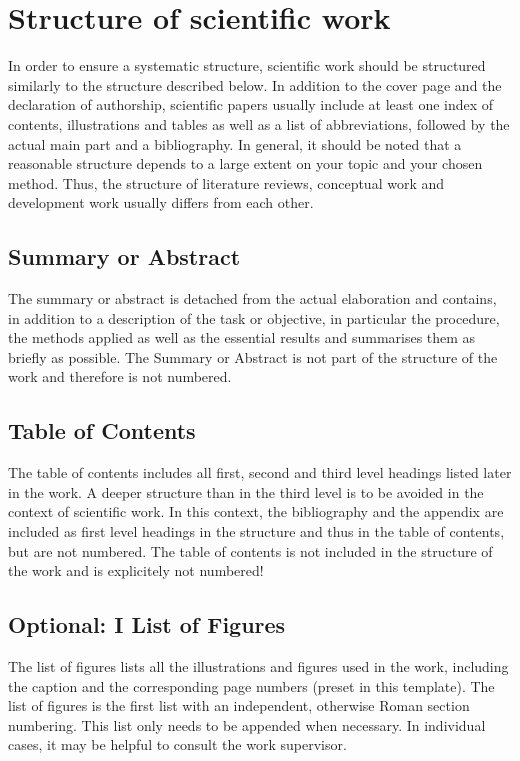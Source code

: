 
\section{Structure of scientific work}
In order to ensure a systematic structure, scientific work should be structured similarly to the structure described below. In addition to the cover page and the declaration of authorship, scientific papers usually include at least one index of contents, illustrations and tables as well as a list of abbreviations, followed by the actual main part and a bibliography. In general, it should be noted that a reasonable structure depends to a large extent on your topic and your chosen method. Thus, the structure of literature reviews, conceptual work and development work usually differs from each other.

\subsection*{Summary or Abstract}
The summary or abstract is detached from the actual elaboration and contains, in addition to a description of the task or objective, in particular the procedure, the methods applied as well as the essential results and summarises them as briefly as possible. The Summary or Abstract is not part of the structure of the work and therefore is not numbered.

\subsection*{Table of Contents}
The table of contents includes all first, second and third level headings listed later in the work. A deeper structure than in the third level is to be avoided in the context of scientific work. In this context, the bibliography and the appendix are included as first level headings in the structure and thus in the table of contents, but are not numbered. The table of contents is not included in the structure of the work and is explicitely not numbered!

\subsection*{Optional: I List of Figures}
The list of figures lists all the illustrations and figures used in the work, including the caption and the corresponding page numbers (preset in this template). The list of figures is the first list with an independent, otherwise Roman section numbering. This list only needs to be appended when necessary. In individual cases, it may be helpful to consult the work supervisor.

